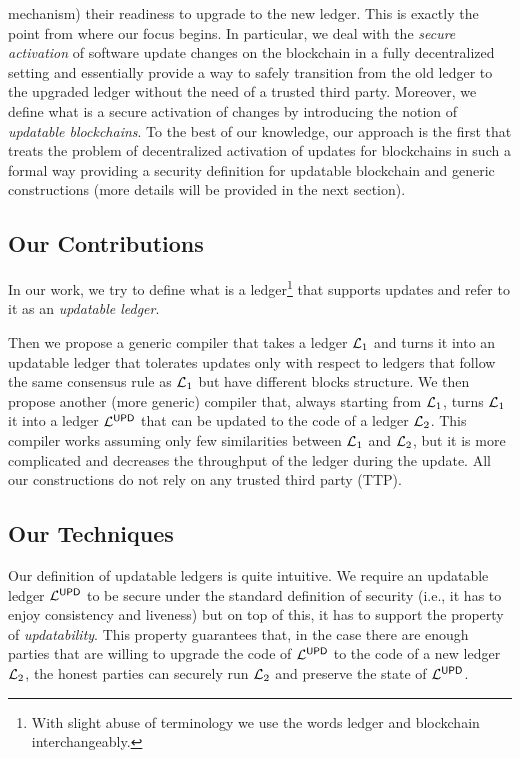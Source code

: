 mechanism) their readiness to upgrade to the new ledger. This is exactly the 
point from where our focus begins. In particular, we deal with the \emph{secure 
activation} of software update changes on the blockchain in a fully 
decentralized setting and essentially 
provide a way to safely transition from the old ledger to the upgraded ledger 
without the need of a trusted third party. Moreover, we define what is a secure 
activation of changes by introducing the notion of \emph{updatable blockchains}. 
To the best of our knowledge, our approach is the first that treats the problem 
of decentralized activation of updates for blockchains in such a formal way 
providing a security definition for updatable blockchain and generic 
constructions (more details will be provided in the next section).


\subsection{Our Contributions}
In our work, we try to define what is a ledger\footnote{With slight abuse of terminology we use the words 
ledger and blockchain interchangeably.} that supports updates and refer to it as an \emph{updatable ledger}.

Then we propose a generic compiler  that takes a ledger $\mathcal{L}_1$ and turns it into an updatable ledger that tolerates updates only with respect to ledgers that follow the same consensus rule as $\mathcal{L}_1$ but have different blocks structure. 
We then propose another (more generic) compiler that, always starting from $\mathcal{L}_1$, turns  $\mathcal{L}_1$ it into a ledger $\mathcal{L}^\mathsf{UPD}$ that can be updated to the code of a ledger $\mathcal{L}_2$. This compiler works assuming only few similarities between $\mathcal{L}_1$ and $\mathcal{L}_2$, but it is more complicated and decreases the throughput of the ledger during the update. All our constructions do not rely on any trusted third party (TTP).


\subsection{Our Techniques} Our definition of updatable ledgers is quite intuitive. We require
an updatable ledger $\mathcal{L}^\mathsf{UPD}$ to be secure under the standard definition of security (i.e., it has to enjoy consistency and liveness) but on top of this, it has to support the property of \emph{updatability}. 
This property guarantees that, in the case there are  enough parties that are willing to upgrade 
the code of $\mathcal{L}^\mathsf{UPD}$ to the code of a new ledger $\mathcal{L}_2$, the honest parties can securely run $\mathcal{L}_2$
and preserve the state of $\mathcal{L}^\mathsf{UPD}$.

